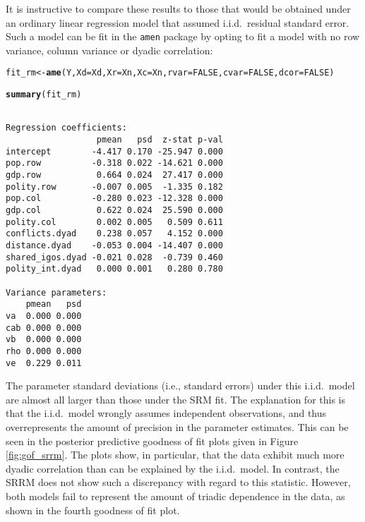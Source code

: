 \documentclass[11pt]{article}\usepackage[]{graphicx}\usepackage[]{color}
\makeatletter
\newcommand{\hlnum}[1]{\textcolor[rgb]{0.686,0.059,0.569}{#1}}%
\newcommand{\hlstd}[1]{\textcolor[rgb]{0.345,0.345,0.345}{#1}}%
\newcommand{\hlkwb}[1]{\textcolor[rgb]{0.69,0.353,0.396}{#1}}%
\newcommand{\hlkwc}[1]{\textcolor[rgb]{0.333,0.667,0.333}{#1}}%
\newcommand{\hlkwd}[1]{\textcolor[rgb]{0.737,0.353,0.396}{\textbf{#1}}}%
\newenvironment{kframe}{%
 \def\at@end@of@kframe{}%
 \ifinner\ifhmode%
  \def\at@end@of@kframe{\end{minipage}}%
  \begin{minipage}{\columnwidth}%
 \fi\fi%
 \def\FrameCommand##1{\hskip\@totalleftmargin \hskip-\fboxsep
 \colorbox{shadecolor}{##1}\hskip-\fboxsep
     \hskip-\linewidth \hskip-\@totalleftmargin \hskip\columnwidth}%
 \MakeFramed {\advance\hsize-\width
   \@totalleftmargin\z@ \linewidth\hsize
   \@setminipage}}%
 {\par\unskip\endMakeFramed%
 \at@end@of@kframe}
\newenvironment{knitrout}{}{} %
\makeatother
\begin{document}
It is instructive to compare these results to those that would be obtained 
under an ordinary linear regression model that assumed i.i.d.\ residual standard error. 
Such a model can be fit in the {\tt amen} package by opting 
to fit a model with no row variance, column variance or dyadic correlation:
\begin{knitrout}\footnotesize
{}\color{fgcolor}\begin{kframe}
\begin{alltt}
\hlstd{fit_rm}\hlkwb{<-}\hlkwd{ame}\hlstd{(Y,}\hlkwc{Xd}\hlstd{=Xd,}\hlkwc{Xr}\hlstd{=Xn,}\hlkwc{Xc}\hlstd{=Xn,}\hlkwc{rvar}\hlstd{=}\hlnum{FALSE}\hlstd{,}\hlkwc{cvar}\hlstd{=}\hlnum{FALSE}\hlstd{,}\hlkwc{dcor}\hlstd{=}\hlnum{FALSE}\hlstd{)}
\end{alltt}
\end{kframe}
\end{knitrout}


\begin{knitrout}\footnotesize
{}\color{fgcolor}\begin{kframe}
\begin{alltt}
\hlkwd{summary}\hlstd{(fit_rm)}
\end{alltt}
\begin{verbatim}

Regression coefficients:
                  pmean   psd  z-stat p-val
intercept        -4.417 0.170 -25.947 0.000
pop.row          -0.318 0.022 -14.621 0.000
gdp.row           0.664 0.024  27.417 0.000
polity.row       -0.007 0.005  -1.335 0.182
pop.col          -0.280 0.023 -12.328 0.000
gdp.col           0.622 0.024  25.590 0.000
polity.col        0.002 0.005   0.509 0.611
conflicts.dyad    0.238 0.057   4.152 0.000
distance.dyad    -0.053 0.004 -14.407 0.000
shared_igos.dyad -0.021 0.028  -0.739 0.460
polity_int.dyad   0.000 0.001   0.280 0.780

Variance parameters:
    pmean   psd
va  0.000 0.000
cab 0.000 0.000
vb  0.000 0.000
rho 0.000 0.000
ve  0.229 0.011
\end{verbatim}
\end{kframe}
\end{knitrout}

The parameter standard deviations (i.e., standard errors) under this i.i.d.\  model are 
almost all larger than those under the SRM fit. The explanation for this is that 
the i.i.d.\ model wrongly assumes independent observations, and thus 
overrepresents the amount of precision in the parameter estimates. 
This can be seen in the posterior predictive goodness of fit plots given in 
Figure \ref{fig:gof_srrm}. The plots show, in particular, that the data exhibit 
much more dyadic correlation than can be explained by the i.i.d.\ model. In 
contrast, the SRRM does not show such a discrepancy with regard to this statistic. 
However, both models fail to represent the amount of triadic dependence in the data, 
as shown in the fourth goodness of fit plot. 
\end{document}
